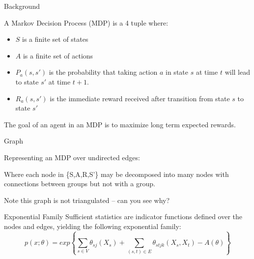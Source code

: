 \documentclass{beamer}
\begin{document}
\begin{frame}{Background}

A Markov Decision Process (MDP) is a 4 tuple where:
\begin{itemize}
\item $S$ is a finite set of states
\item $A$ is a finite set of actions
\item $P_a(s,s')$ is the probability that taking action $a$ in state $s$ at time $t$ will lead to state $s'$ at time $t+1$.
\item $R_a(s,s')$ is the immediate reward received after transition from state $s$ to state $s'$
\end{itemize}

The goal of an agent in an MDP is to maximize long term expected rewards. 

\end{frame}


\begin{frame}{Graph}

Representing an MDP over undirected edges:

Where each node in \{S,A,R,S'\} may be decomposed into many nodes with connections between groups but not with a group. 

Note this graph is not triangulated -- can you see why?
\end{frame}

\begin{frame}{Exponential Family}
Sufficient statistics are indicator functions defined over the nodes and edges, yielding the following exponential family:
$$
p(x;\theta)
=
exp\left\{\sum_{s \in V}\theta_{sj}(X_s) + \sum_{(s,t) \in E} \theta_{stjk}(X_s,X_t) - A(\theta)\right\}
$$
\end{frame}
\end{document}
